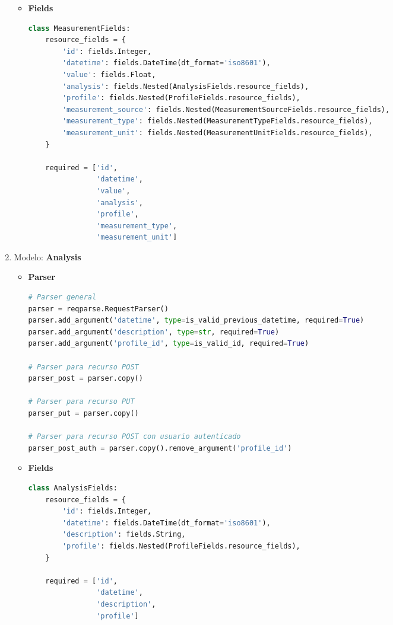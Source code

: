 \begin{enumerate}
\begin{itemize}
	\item \textbf{Fields}
	
\begin{lstlisting}[language=Python]
class MeasurementFields:
    resource_fields = {
        'id': fields.Integer,
        'datetime': fields.DateTime(dt_format='iso8601'),
        'value': fields.Float,
        'analysis': fields.Nested(AnalysisFields.resource_fields),
        'profile': fields.Nested(ProfileFields.resource_fields),
        'measurement_source': fields.Nested(MeasurementSourceFields.resource_fields),
        'measurement_type': fields.Nested(MeasurementTypeFields.resource_fields),
        'measurement_unit': fields.Nested(MeasurementUnitFields.resource_fields),
    }

    required = ['id',
                'datetime',
                'value',
                'analysis',
                'profile',
                'measurement_type',
                'measurement_unit']
\end{lstlisting}

\end{itemize}

\item Modelo: \textbf{Analysis}

\begin{itemize}
	\item \textbf{Parser}
	
\begin{lstlisting}[language=Python]
# Parser general
parser = reqparse.RequestParser()
parser.add_argument('datetime', type=is_valid_previous_datetime, required=True)
parser.add_argument('description', type=str, required=True)
parser.add_argument('profile_id', type=is_valid_id, required=True)

# Parser para recurso POST
parser_post = parser.copy()

# Parser para recurso PUT
parser_put = parser.copy()

# Parser para recurso POST con usuario autenticado
parser_post_auth = parser.copy().remove_argument('profile_id')
\end{lstlisting}

	\item \textbf{Fields}
	
\begin{lstlisting}[language=Python]
class AnalysisFields:
    resource_fields = {
        'id': fields.Integer,
        'datetime': fields.DateTime(dt_format='iso8601'),
        'description': fields.String,
        'profile': fields.Nested(ProfileFields.resource_fields),
    }

    required = ['id',
                'datetime',
                'description',
                'profile']
\end{lstlisting}

\end{itemize}

\end{enumerate}

